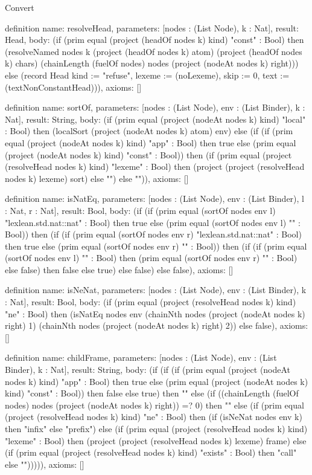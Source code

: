 \begin{lexlean}{Convert}
\begin{semanticmodule}
definition{
  name: resolveHead,
  parameters: [nodes : (List Node), k : Nat],
  result: Head,
  body: (if (prim equal (project (headOf nodes k) kind) "const" : Bool) then (resolveNamed nodes k (project (headOf nodes k) atom) (project (headOf nodes k) chars) (chainLength (fuelOf nodes) nodes (project (nodeAt nodes k) right))) else (record Head {kind := "refuse", lexeme := (noLexeme), skip := 0, text := (textNonConstantHead)})),
  axioms: []
}

definition{
  name: sortOf,
  parameters: [nodes : (List Node), env : (List Binder), k : Nat],
  result: String,
  body: (if (prim equal (project (nodeAt nodes k) kind) "local" : Bool) then (localSort (project (nodeAt nodes k) atom) env) else (if (if (prim equal (project (nodeAt nodes k) kind) "app" : Bool) then true else (prim equal (project (nodeAt nodes k) kind) "const" : Bool)) then (if (prim equal (project (resolveHead nodes k) kind) "lexeme" : Bool) then (project (project (resolveHead nodes k) lexeme) sort) else "") else "")),
  axioms: []
}

definition{
  name: isNatEq,
  parameters: [nodes : (List Node), env : (List Binder), l : Nat, r : Nat],
  result: Bool,
  body: (if (if (prim equal (sortOf nodes env l) "lexlean.std.nat::nat" : Bool) then true else (prim equal (sortOf nodes env l) "" : Bool)) then (if (if (prim equal (sortOf nodes env r) "lexlean.std.nat::nat" : Bool) then true else (prim equal (sortOf nodes env r) "" : Bool)) then (if (if (prim equal (sortOf nodes env l) "" : Bool) then (prim equal (sortOf nodes env r) "" : Bool) else false) then false else true) else false) else false),
  axioms: []
}

definition{
  name: isNeNat,
  parameters: [nodes : (List Node), env : (List Binder), k : Nat],
  result: Bool,
  body: (if (prim equal (project (resolveHead nodes k) kind) "ne" : Bool) then (isNatEq nodes env (chainNth nodes (project (nodeAt nodes k) right) 1) (chainNth nodes (project (nodeAt nodes k) right) 2)) else false),
  axioms: []
}

definition{
  name: childFrame,
  parameters: [nodes : (List Node), env : (List Binder), k : Nat],
  result: String,
  body: (if (if (if (prim equal (project (nodeAt nodes k) kind) "app" : Bool) then true else (prim equal (project (nodeAt nodes k) kind) "const" : Bool)) then false else true) then "" else (if ((chainLength (fuelOf nodes) nodes (project (nodeAt nodes k) right)) =? 0) then "" else (if (prim equal (project (resolveHead nodes k) kind) "ne" : Bool) then (if (isNeNat nodes env k) then "infix" else "prefix") else (if (prim equal (project (resolveHead nodes k) kind) "lexeme" : Bool) then (project (project (resolveHead nodes k) lexeme) frame) else (if (prim equal (project (resolveHead nodes k) kind) "exists" : Bool) then "call" else ""))))),
  axioms: []
}


\end{semanticmodule}
\end{lexlean}
